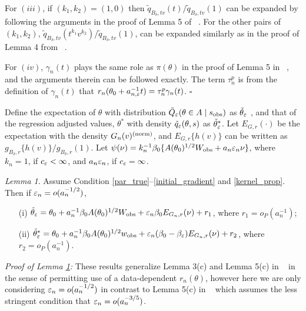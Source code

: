 \documentclass[9pt]{article}
\theoremstyle{remark}
\newtheorem{lemma}{Lemma}
\begin{document}
	For $(iii)$, if $(k_1,k_2)=(1,0)$ then $\tilde{q}_{B_{\delta},tv}(t)/\tilde{q}_{B_{\delta},tv}(1)$
	can be expanded by following the arguments in the proof of Lemma 5
	of ~\cite{Li2016}. For the other pairs of $(k_1,k_2)$, $\tilde{q}_{B_{\delta},tv}(t^{k_{1}}v^{k_{2}})/\tilde{q}_{B_{\delta},tv}(1)$,
	can be expanded similarly as in the proof of Lemma 4 from ~\cite{Li2017}.
	
	For $(iv)$, $\gamma_{n}(t)$ plays the same role as $\pi(\theta)$
	in the proof of Lemma 5 in ~\cite{Li2016}, and the arguments therein
	can be followed exactly. The term $\tau_{n}^{p}$ is from the definition
	of $\gamma_{n}(t)$ that $r_{n}(\theta_0+a_{n,\varepsilon}^{-1}t)=\tau_{n}^{p}\gamma_{n}(t)$.
	\hfill{$\square$} 
	
	
\pagebreak 
Define the expectation of $\theta$ with distribution $\tilde{Q}_{\varepsilon}(\theta\in A\mid s_{\rm obs})$
as $\tilde{\theta}_{\varepsilon}$ , and that of the regression adjusted values, $\theta^*$ 
with density $\tilde{q}_{\varepsilon}(\theta,s)$ as $\tilde{\theta}_{\varepsilon}^{*}$.
Let $E_{G,r}(\cdot)$ be the expectation with the density $G_{n}(v)^{({\rm norm})}$,
and $E_{G,r}\{h(v)\}$ can be written as $g_{B_{\delta},r}\{h(v)\}/g_{B_{\delta},r}(1)$.
Let $\psi(\nu)=k_{n}^{-1}\beta_{0}\{A(\theta_{0})^{1/2}W_{\rm obs}+a_{n}\varepsilon_{n}\nu\}$,
where $k_{n}=1$, if $c_{\varepsilon}<\infty$, and $a_{n}\varepsilon_{n}$,
if $c_{\varepsilon}=\infty$. 

\begin{lemma}\label{Alemma3} Assume Condition \ref{par_true}--\ref{initial_gradient} and \ref{kernel_prop}. Then if $\varepsilon_{n}=o(a_{n}^{-1/2})$, 
	\begin{enumerate}
		\item[(i)] $\tilde{\theta}_{\varepsilon}=\theta_{0}+a_{n}^{-1}\beta_{0}A(\theta_{0})^{1/2}W_{\rm obs}+\varepsilon_{n}\beta_{0}E_{G_{n},r}(\nu)+r_{1}$,
		where $r_{1}=o_{P}(a_{n}^{-1})$; 
		\item[(ii)] $\tilde{\theta}_{\varepsilon}^{*}=\theta_{0}+a_{n}^{-1}\beta_{0}A(\theta_{0})^{1/2}w_{\rm obs}+\varepsilon_{n}(\beta_{0}-\beta_{\varepsilon})E_{G_{n},r}(\nu)+r_{2}$,
		where $r_{2}=o_{P}(a_{n}^{-1})$. 
	\end{enumerate}\end{lemma}
{\it Proof of Lemma \ref{Alemma3}:} 
	These results generalize Lemma 3(c) and Lemma 5(c) in ~\cite{Li2017} in the sense of permitting use of a data-dependent $r_n(\theta)$, however here we are only considering $\varepsilon_n = o(a_n^{-1/2})$ in contrast to Lemma 5(c) in ~\cite{Li2017} which assumes the less stringent condition that $\varepsilon_n = o(a_n^{-3/5})$.
	
\end{document}
